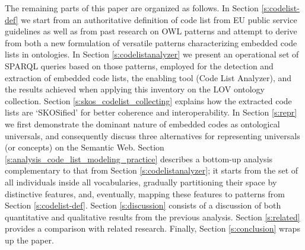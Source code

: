 The remaining parts of this paper are organized as follows. 
In Section \ref{s:codelist-def} we start from an authoritative definition of code list from EU public service guidelines as well as from past research on OWL patterns and attempt to derive from both a new formulation of versatile patterns characterizing embedded code lists in ontologies. 
In Section \ref{s:codelistanalyzer} we present an operational set of SPARQL queries based on those patterns, employed for the detection and extraction of embedded code lists, the enabling tool (Code List Analyzer), and the results achieved when applying this inventory on the LOV ontology collection.
Section \ref{s:skos_codelist_collecting} explains how the extracted code lists are `SKOSified' for better coherence and interoperability.
In Section \ref{s:repr} we first demonstrate the dominant nature of embedded codes as ontological universals, and consequently discuss three alternatives for representing universals (or concepts) on the Semantic Web.
Section \ref{s:analysis_code_list_modeling_practice} describes a bottom-up analysis complementary to that from Section \ref{s:codelistanalyzer}; it starts from the set of all individuals inside all vocabularies, gradually partitioning their space by distinctive features, and, eventually, mapping these features to patterns from Section \ref{s:codelist-def}.
Section \ref{s:discussion} consists of a discussion of both quantitative and qualitative results from the previous analysis.
Section \ref{s:related} provides a comparison with related research.
Finally, Section \ref{s:conclusion} wraps up the paper.
